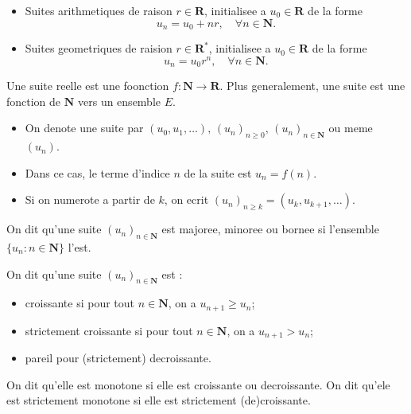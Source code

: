 \begin{example}
\begin{itemize}
\item Suites arithmetiques de raison $r\in \mathbf{R}$, initialisee a $u_{0}\in \mathbf{R}$ de la forme
$$
u_{n}=u_{0}+nr,\quad \forall n\in \mathbf{N}.
$$
\item Suites geometriques de raision $r\in \mathbf{R}^{*}$, initialisee a $u_{0}\in \mathbf{R}$ de la forme
$$
u_{n}=u_{0}r^{n},\quad \forall n\in \mathbf{N}.
$$
\end{itemize}
\end{example}
\begin{definition}
Une suite reelle est une foonction $f:\mathbf{N}\to \mathbf{R}$. Plus generalement, une suite est une fonction de $\mathbf{N}$ vers un ensemble $E$.
\end{definition}
\begin{notation}
\begin{itemize}
\item On denote une suite par $(u_{0},u_{1},\dots), \,(u_{n})_{n\ge0},\, (u_{n})_{n\in \mathbf{N}}$ ou meme $(u_{n})$.
\item Dans ce cas, le terme d'indice $n$ de la suite est $u_{n}=f(n)$.
\item Si on numerote a partir de $k$, on ecrit $(u_{n})_{n\ge k}=(u_{k},u_{k+1},\dots)$.
\end{itemize}
\end{notation}
\begin{definition}
On dit qu'une suite $(u_{n})_{n\in \mathbf{N}}$ est majoree, minoree ou bornee si l'ensemble $\{ u_{n}:n\in \mathbf{N} \}$ l'est.
\end{definition}
\begin{definition}
On dit qu'une suite $(u_{n})_{n\in \mathbf{N}}$ est :
\begin{itemize}
\item croissante si pour tout $n\in \mathbf{N}$, on a $u_{n+1}\ge u_{n}$;
\item strictement croissante si pour tout $n\in \mathbf{N}$, on a $u_{n+1}>u_{n}$;
\item pareil pour (strictement) decroissante.
\end{itemize}
On dit qu'elle est monotone si elle est croissante ou decroissante. On dit qu'ele est strictement monotone si elle est strictement (de)croissante. 
\end{definition}
